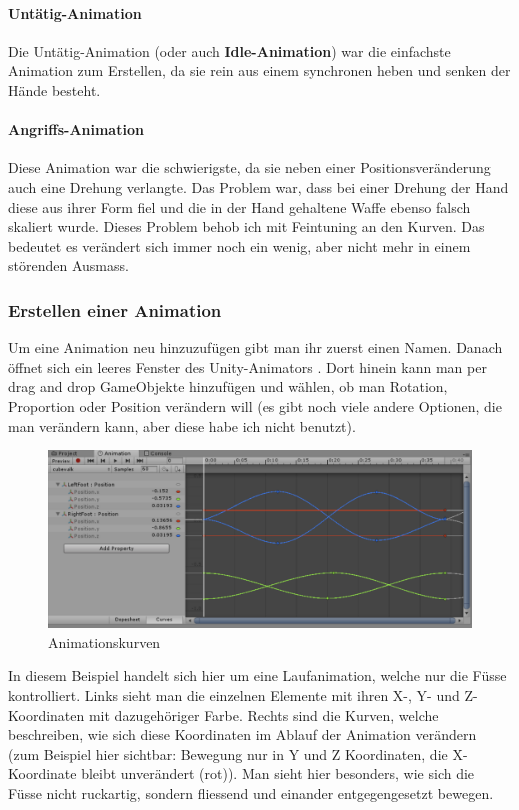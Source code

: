 \paragraph{Untätig-Animation}
Die Untätig-Animation (oder auch \textbf{Idle-Animation}) war die einfachste Animation zum Erstellen, da sie rein aus einem synchronen heben und senken der Hände besteht.

\paragraph{Angriffs-Animation}

Diese Animation war die schwierigste, da sie neben einer Positionsveränderung auch eine Drehung verlangte.
Das Problem war, dass bei einer Drehung der Hand diese aus ihrer Form fiel und die in der Hand gehaltene Waffe ebenso falsch skaliert wurde.
Dieses Problem behob ich mit Feintuning an den Kurven.
Das bedeutet es verändert sich immer noch ein wenig, aber nicht mehr in einem störenden Ausmass.

\subsubsection{Erstellen einer Animation}
Um eine Animation neu hinzuzufügen gibt man ihr zuerst einen Namen.
Danach öffnet sich ein leeres Fenster des Unity-Animators 
.
Dort hinein kann man per drag and drop GameObjekte hinzufügen und wählen, ob man Rotation, Proportion oder Position verändern will (es gibt noch viele andere Optionen, die man verändern 
kann, aber diese habe ich nicht benutzt).

\begin{figure}[H]
\includegraphics[scale=0.7]{screenshots/animations.png}
\caption{Animationskurven}
\end{figure}

In diesem Beispiel handelt sich hier um eine Laufanimation, welche nur die Füsse kontrolliert. Links sieht man die einzelnen Elemente mit ihren X-, Y- und Z-Koordinaten mit dazugehöriger Farbe. Rechts sind die Kurven, welche beschreiben, wie sich diese Koordinaten im Ablauf der Animation verändern (zum Beispiel hier sichtbar: Bewegung nur in Y und Z Koordinaten, die X-Koordinate bleibt unverändert (rot)).
Man sieht hier besonders, wie sich die Füsse nicht ruckartig, sondern fliessend und einander entgegengesetzt bewegen.

